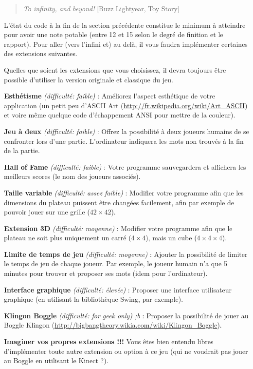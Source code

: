 \documentclass[10pt]{article}
\begin{document}
\begin{quote}
{\it To infinity, and beyond!} [Buzz Lightyear, Toy Story]
\end{quote}


L'état du code à la fin de la section précédente constitue le minimum à
atteindre pour avoir une note potable (entre 12 et 15 selon le degré de
finition et le rapport). Pour aller (vers l'infini et) au delà, il vous faudra
implémenter certaines des extensions suivantes.

Quelles que soient les extensions que vous choisissez, il devra toujours être
possible d'utiliser la version originale et classique du jeu.

{\bf Esthétisme} {\it (difficulté: faible)} : Améliorez l'aspect esthétique de
votre application (un petit peu d'ASCII Art
(\url{http://fr.wikipedia.org/wiki/Art_ASCII}) et voire même quelque code
d'échappement ANSI pour mettre de la couleur).

{\bf Jeu à deux} {\it (difficulté: faible)} : Offrez la possibilité à deux
joueurs humains de se confronter lors d'une partie. L'ordinateur indiquera les
mots non trouvés à la fin de la partie. 

{\bf Hall of Fame} {\it (difficulté: faible)} : Votre programme sauvegardera et
affichera les meilleurs scores (le nom des joueurs associés).

{\bf Taille variable} {\it (difficulté: assez faible)} : Modifier votre programme afin
que les dimensions du  plateau puissent être changées facilement, afin par
exemple de pouvoir jouer sur une grille ($42 \times 42$). 

{\bf Extension 3D} {\it (difficulté: moyenne)} : Modifier votre programme afin
que le plateau ne soit plus uniquement un carré ($4 \times 4$), mais un cube
($4 \times 4 \times 4$). 

{\bf Limite de temps de jeu} {\it (difficulté: moyenne)} : Ajouter la
possibilité de limiter le temps de jeu de chaque joueur. Par exemple, le
joueur humain n'a que 5 minutes pour trouver et proposer ses mots (idem pour
l'ordinateur).

{\bf Interface graphique} {\it (difficulté: élevée)} : Proposer une interface
utilisateur graphique (en utilisant la bibliothèque Swing, par exemple). 

{\bf Klingon Boggle} {\it (difficulté: for geek only) ;b} : Proposer la possibilité de
jouer au Boggle Klingon (\url{http://bigbangtheory.wikia.com/wiki/Klingon_Boggle}).

{\bf Imaginer vos propres extensions !!!} 
Vous êtes bien entendu libres
d'implémenter toute autre extension ou option à ce jeu (qui ne voudrait pas jouer au Boggle en utilisant le Kinect\texttrademark{} ?).
\end{document}
